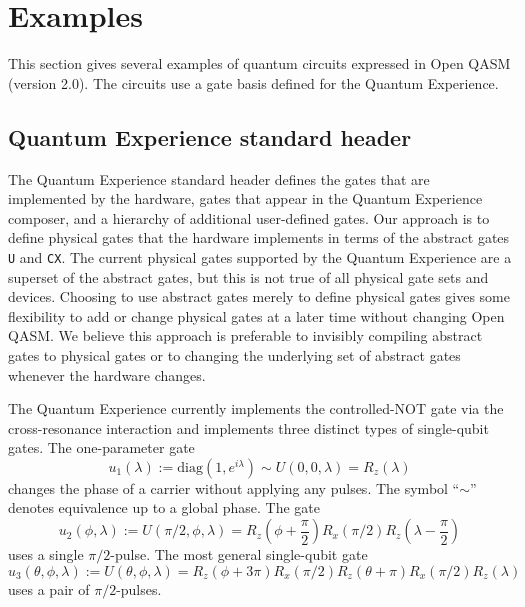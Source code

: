 \documentclass[USenglish,12pt,fleqn]{article} %
\newcommand*{\code}{\texttt}
\begin{document}
\section{Examples}

This section gives several examples of quantum circuits expressed in Open QASM (version 2.0). The circuits use a gate basis defined for the Quantum Experience.

\subsection{Quantum Experience standard header}

The Quantum Experience standard header defines the gates that are implemented by the hardware, gates that appear in the Quantum Experience composer, and a hierarchy of additional user-defined gates. Our approach is to define physical gates that the hardware implements in terms of the abstract gates \code{U} and \code{CX}. The current physical gates supported by the Quantum Experience are a superset of the abstract gates, but this is not true of all physical gate sets and devices. Choosing to use abstract gates merely to define physical gates gives some flexibility to add or change physical gates at a later time without changing Open QASM. We believe this approach is preferable to invisibly compiling abstract gates to physical gates or to changing the underlying set of abstract gates whenever the hardware changes.

The Quantum Experience currently implements the controlled-NOT gate via the cross-resonance interaction and implements three distinct types of single-qubit gates. The one-parameter gate
\begin{equation}
u_1(\lambda) := \mathrm{diag}(1,e^{i\lambda}) \sim U(0,0,\lambda) = R_z(\lambda)
\end{equation}
changes the phase of a carrier without applying any pulses. The symbol ``$\sim$'' denotes equivalence up to a global phase. The gate
\begin{equation}
u_2(\phi,\lambda) := U(\pi/2,\phi,\lambda) = R_z(\phi+\frac{\pi}{2})R_x(\pi/2)R_z(\lambda-\frac{\pi}{2})
\end{equation}
uses a single $\pi/2$-pulse. The most general single-qubit gate
\begin{equation}
u_3(\theta,\phi,\lambda) := U(\theta,\phi,\lambda) = R_z(\phi+3\pi)R_x(\pi/2)R_z(\theta+\pi)R_x(\pi/2)R_z(\lambda)
\end{equation}
uses a pair of $\pi/2$-pulses.
\end{document}
